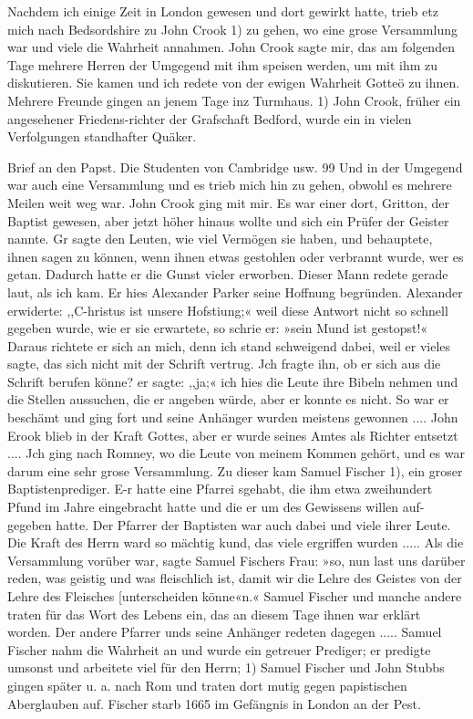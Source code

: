 Nachdem ich einige Zeit in London gewesen und dort gewirkt
hatte, trieb etz mich nach Bedsordshire zu John Crook 1) zu gehen,
wo eine grose Versammlung war und viele die Wahrheit annahmen.
John Crook sagte mir, das am folgenden Tage mehrere Herren
der Umgegend mit ihm speisen werden, um mit ihm zu diskutieren.
Sie kamen und ich redete von der ewigen Wahrheit Gotteö zu
ihnen. Mehrere Freunde gingen an jenem Tage inz Turmhaus.
1) John Crook, früher ein angesehener Friedens-richter der Grafschaft
Bedford, wurde ein in vielen Verfolgungen standhafter Quäker.


Brief an den Papst. Die Studenten von Cambridge usw. 99
Und in der Umgegend war auch eine Versammlung und es trieb
mich hin zu gehen, obwohl es mehrere Meilen weit weg war.
John Crook ging mit mir. Es war einer dort, Gritton, der
Baptist gewesen, aber jetzt höher hinaus wollte und sich ein Prüfer
der Geister nannte. Gr sagte den Leuten, wie viel Vermögen
sie haben, und behauptete, ihnen sagen zu können, wenn ihnen
etwas gestohlen oder verbrannt wurde, wer es getan. Dadurch
hatte er die Gunst vieler erworben. Dieser Mann redete gerade
laut, als ich kam. Er hies Alexander Parker seine Hoffnung
begründen. Alexander erwiderte: ,,C-hristus ist unsere Hofstiung;«
weil diese Antwort nicht so schnell gegeben wurde, wie er sie
erwartete, so schrie er: »sein Mund ist gestopst!« Daraus richtete
er sich an mich, denn ich stand schweigend dabei, weil er vieles
sagte, das sich nicht mit der Schrift vertrug. Jch fragte ihn,
ob er sich aus die Schrift berufen könne? er sagte: ,,ja;« ich hies
die Leute ihre Bibeln nehmen und die Stellen aussuchen, die
er angeben würde, aber er konnte es nicht. So war er beschämt
und ging fort und seine Anhänger wurden meistens gewonnen ....
John Erook blieb in der Kraft Gottes, aber er wurde seines
Amtes als Richter entsetzt ....
Jch ging nach Romney, wo die Leute von meinem Kommen
gehört, und es war darum eine sehr grose Versammlung. Zu
dieser kam Samuel Fischer 1), ein groser Baptistenprediger. E-r
hatte eine Pfarrei sgehabt, die ihm etwa zweihundert Pfund im
Jahre eingebracht hatte und die er um des Gewissens willen auf-
gegeben hatte. Der Pfarrer der Baptisten war auch dabei und
viele ihrer Leute. Die Kraft des Herrn ward so mächtig kund,
das viele ergriffen wurden ..... Als die Versammlung vorüber
war, sagte Samuel Fischers Frau: »so, nun last uns darüber
reden, was geistig und was fleischlich ist, damit wir die Lehre
des Geistes von der Lehre des Fleisches [unterscheiden könne«n.«
Samuel Fischer und manche andere traten für das Wort des
Lebens ein, das an diesem Tage ihnen war erklärt worden. Der
andere Pfarrer unds seine Anhänger redeten dagegen .....
Samuel Fischer nahm die Wahrheit an und wurde ein getreuer
Prediger; er predigte umsonst und arbeitete viel für den Herrn;
1) Samuel Fischer und John Stubbs gingen später u. a. nach Rom und
traten dort mutig gegen papistischen Aberglauben auf. Fischer starb 1665 im
Gefängnis in London an der Pest.
 
